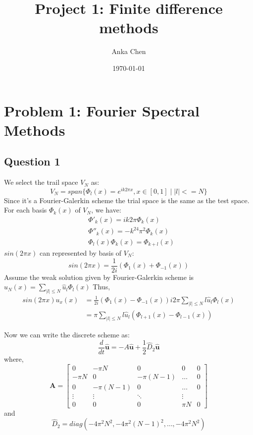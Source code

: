 \documentclass[12pt, fullpage,letterpaper]{article}
\title{Project 1: Finite difference methods}
\author{Anka Chen}
\date{\today}
\begin{document}
\maketitle

\section{Problem 1: Fourier Spectral Methods}
\subsection{Question 1}
We select the trail space $V_N$ as: 
\begin{equation}
    V_N=span\{\Phi_l(x)=e^{i k 2 \pi x},  x \in[0,1] \mid |l| <= N\}
\end{equation}
Since it's a Fourier-Galerkin scheme the trial space is the same as the test space.
For each basis $ \Phi_k(x)$ of $V_N$, we have:
\begin{align}
    & \Phi'_k(x) =  ik2\pi \Phi_k(x) \\
    & \Phi''_k(x) =  -k^24\pi^2 \Phi_k(x) \\ 
    & \Phi_l(x)\Phi_k(x) = \Phi_{k+l}(x)
\end{align}
$sin(2\pi x)$ can represented by basis of $V_N$:
\begin{equation}
    sin(2\pi x) = \frac{1}{2i} (\Phi_1(x) + \Phi_{-1}(x))
\end{equation}
Assume the weak solution given by Fourier-Galerkin scheme is $u_N(x) = \sum_{|l| \leq N} \hat{u}_l \Phi_l(x)$
Thus, 
\begin{align}
    sin(2\pi x) u_x(x) & = \frac{1}{2i} (\Phi_1(x) - \Phi_{-1}(x)) i2\pi \sum_{|l| \leq N} l \hat{u}_l  \Phi_l(x) \\
    &= \pi \sum_{|l| \leq N} l \hat{u}_l  (\Phi_{l+1}(x) - \Phi_{l-1}(x))
\end{align}

Now we can write the discrete scheme as:
\begin{equation}
    \frac{d}{dt} \hat{\mathbf{u}} = - A\hat{\mathbf{u}} + \frac{1}{2} \hat{D}_2 \hat{\mathbf{u}}
\end{equation}
where,
\begin{equation}
\mathbf{A}=
\begin{bmatrix}
0 & -\pi N &0 & 0 & 0 \\
-\pi N & 0 & -\pi (N-1) &\hdots & 0 \\
0 & -\pi (N-1) &0  &\hdots & 0 \\

\vdots &  \vdots  & \ddots & \vdots \\
0 & 0 & 0 & \pi N & 0
\end{bmatrix} 
\end{equation}
and
\begin{equation}
    \hat{D}_2 = diag(-4\pi^2N^2, -4\pi^2(N-1)^2, \dots,  -4\pi^2 N^2)
\end{equation}
\end{document}
